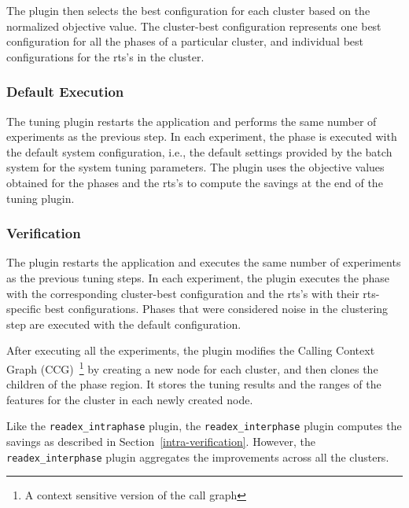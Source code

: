 The plugin then selects the best configuration for each cluster based on the normalized objective value. The cluster-best configuration represents one best configuration for all the phases of a particular cluster, and individual best configurations for the rts's in the cluster.

\subsubsection{Default Execution} \label{default-execution} 
The tuning plugin restarts the application and performs the same number of experiments as the previous step. In each experiment, the phase is executed with the default system configuration, i.e., the default settings provided by the batch system for the system tuning parameters. The plugin uses the objective values obtained for the phases and the rts's to compute the savings at the end of the tuning plugin.

\subsubsection{Verification} \label{verification} 
The plugin restarts the application and executes the same number of experiments as the previous tuning steps. In each experiment, the plugin executes the phase with the
corresponding cluster-best configuration and the rts's with their rts-specific
best configurations. Phases that were considered noise in the clustering step are executed with the default configuration.

After executing all the experiments, the plugin modifies the Calling Context Graph (CCG)~\footnote{A context sensitive version of the call graph} by creating a new node for each cluster, and then clones the children of the phase region. It stores the tuning results and the ranges of the features for the cluster in each newly created node. 

Like the \texttt{readex\_intraphase} plugin, the \texttt{readex\_interphase} plugin computes the savings as described in Section~\ref{intra-verification}. However, the \texttt{readex\_interphase} plugin aggregates the improvements across all the clusters.


